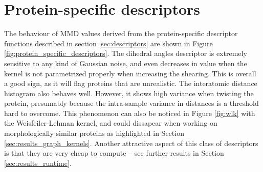 \section{Protein-specific descriptors}\label{sec:results_protein_descriptors}

The behaviour of MMD values derived from the protein-specific descriptor
functions described in section \ref{sec:descriptors} are shown in Figure
\ref{fig:protein_specific_descriptors}. The dihedral angles descriptor is
extremely sensitive to any kind of Gaussian noise, and even decreases in value
when the kernel is not parametrized properly when increasing the shearing. This
is overall a good sign, as it will flag proteins that are unrealistic. The
interatomic distance histogram also behaves well. However, it shows high
variance when twisting the protein, presumably because the intra-sample variance
in distances is a threshold hard to overcome. This phenomenon can also be
noticed in Figure \ref{fig:wlk} with the Weisfeiler-Lehman kernel, and could
dissapear when working on morphologically similar proteins as highlighted in
Section \ref{sec:results_graph_kernels}. Another attractive aspect of this class
of descriptors is that they are very cheap to compute -- see further results in
Section \ref{sec:results_runtime}.

